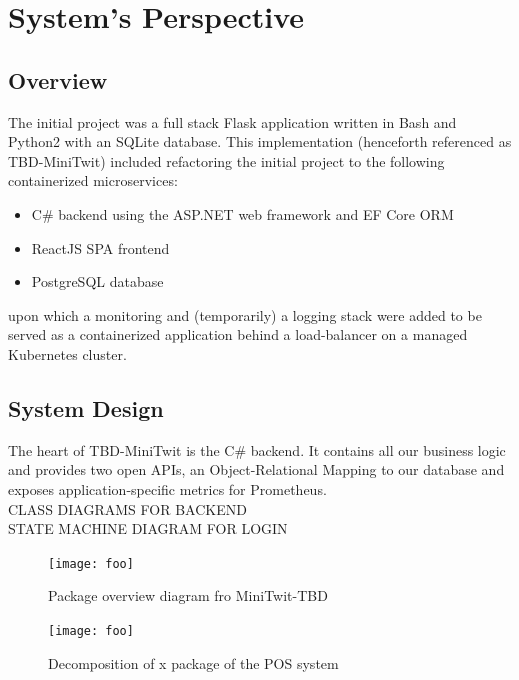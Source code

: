 \section{System's Perspective}
\label{sec:systems_perspective}

\subsection{Overview}
\label{subsec:systems_perspective_overview}
The initial project was a full stack Flask application written in Bash and Python2 with an SQLite database. 
This implementation (henceforth referenced as TBD-MiniTwit) included refactoring the initial project to the following containerized microservices:
\begin{itemize}
    \item C\# backend using the ASP.NET web framework and EF Core ORM
    \item ReactJS SPA frontend
    \item PostgreSQL database
\end{itemize}
upon which a monitoring and (temporarily) a logging stack were added to be served as a containerized application behind a load-balancer on a managed Kubernetes cluster.

\subsection{System Design}
\label{subsec:system_design}
The heart of TBD-MiniTwit is the C\# backend.
It contains all our business logic and provides two open APIs, an Object-Relational Mapping to our database and exposes application-specific metrics for Prometheus. \\
CLASS DIAGRAMS FOR BACKEND \\
STATE MACHINE DIAGRAM FOR LOGIN \\

\begin {figure}[H]
    \centering
    \texttt{[image: foo]}
    \caption{Package overview diagram fro MiniTwit-TBD}
    \label{fig:legacyDeploy}
\end{figure}

\begin {figure}[H]
    \centering
    \texttt{[image: foo]}
    \caption{Decomposition of x package of the POS system}
    \label{fig:legacyDeploy}
\end{figure}



